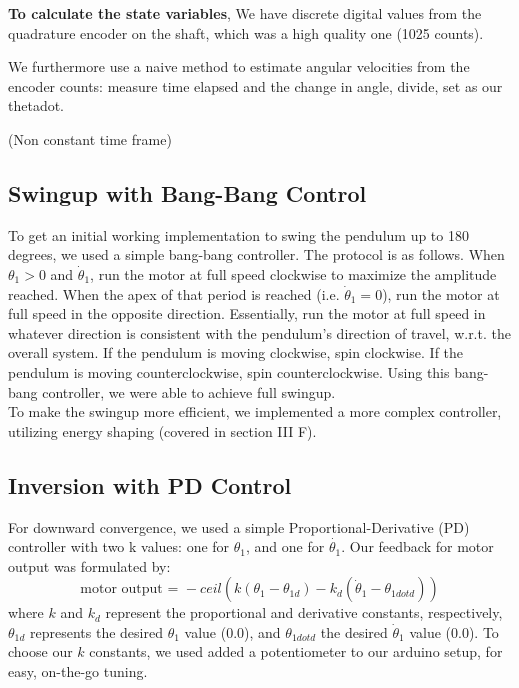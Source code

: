 \documentclass[conference]{IEEEtran}
\begin{document}
\textbf{To calculate the state variables}, 
We have discrete digital values from the quadrature encoder on the shaft, which
was a high quality one (1025 counts).

We furthermore use a naive method to estimate angular velocities from the
encoder counts: measure time elapsed and the change in angle, divide, set as our
thetadot.

(Non constant time frame)

\subsection{Swingup with Bang-Bang Control}
To get an initial working implementation to swing the pendulum up to 180 degrees, we used a simple bang-bang controller. The protocol is as follows. When $\theta_1 > 0$ and $\dot{\theta}_1$, run the motor at full speed clockwise to maximize the amplitude reached. When the apex of that period is reached (i.e. $\dot{\theta}_1 = 0$), run the motor at full speed in the opposite direction. Essentially, run the motor at full speed in whatever direction is consistent with the pendulum's direction of travel, w.r.t. the overall system. If the pendulum is moving clockwise, spin clockwise. If the pendulum is moving counterclockwise, spin counterclockwise. Using this bang-bang controller, we were able to achieve full swingup.\\ \indent
To make the swingup more efficient, we implemented a more complex controller, utilizing energy shaping (covered in section III F).
\subsection{Inversion with PD Control}
For downward convergence, we used a simple Proportional-Derivative (PD) controller with two k values: one for $\theta_1$, and one for $\dot{\theta_1}$. Our feedback for motor output was formulated by: $$\textrm{motor output = } - ceil(k(\theta_1-\theta_{1d})-k_d (\dot{\theta}_1-\theta_{1dotd}))$$ where $k$ and $k_d$ represent the proportional and derivative constants, respectively, $\theta_{1d}$ represents the desired $\theta_1$ value (0.0), and $\theta_{1dotd}$ the desired $\dot{\theta}_1$ value (0.0). To choose our $k$ constants, we used added a potentiometer to our arduino setup, for easy, on-the-go tuning. 
\end{document}
